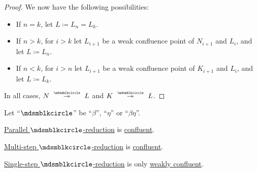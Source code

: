 \begin{proof}
  We now have the following possibilities:
  \begin{itemize}
    \item If \( n = k \), let \( L \coloneqq L_n = L_k \).
    \item If \( n > k \), for \( i > k \) let \( L_{i+1} \) be a weak confluence point of \( N_{i+1} \) and \( L_i \), and let \( L \coloneqq L_n \).
    \item If \( n < k \), for \( i > n \) let \( L_{i+1} \) be a weak confluence point of \( K_{i+1} \) and \( L_i \), and let \( L \coloneqq L_k \).
  \end{itemize}

  In all cases, \( N \pred* L \) and \( K \pred* L \).
\end{proof}

\begin{theorem}\label{thm:church_rosser_theorem}
  Let \enquote{\( {\Anon} \)} be \enquote{\( \beta \)}, \enquote{\( \eta \)} or \enquote{\( \beta\eta \)}.

  \begin{thmenum}
     \hyperref[def:parallel_reduction]{Parallel \( \Anon \)-reduction} is \hyperref[def:reduction_confluence]{confluent}.

     \hyperref[def:lambda_reduction/multi]{Multi-step \( \Anon \)-reduction} is \hyperref[def:reduction_confluence]{confluent}.

     \hyperref[def:lambda_reduction/single]{Single-step \( \Anon \)-reduction} is only \hyperref[def:reduction_confluence]{weakly confluent}.
  \end{thmenum}
\end{theorem}
